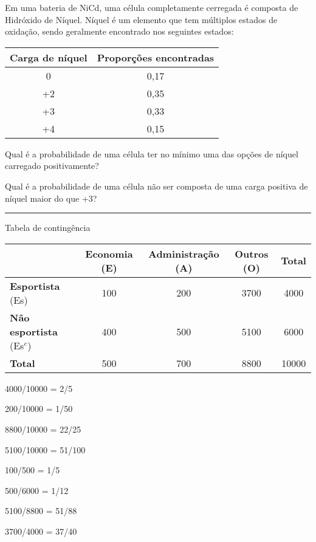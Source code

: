 \documentclass[a4paper,11pt,fleqn]{article}\usepackage[]{graphicx}\usepackage[]{color}
\theoremstyle{definition}
\begin{document}
\begin{compactenum}
\item Em uma bateria de NiCd,  uma célula completamente cerregada é
  composta de Hidróxido de Níquel. Níquel é um elemento que tem
  múltiplos estados de oxidação, sendo geralmente encontrado nos
  seguintes estados:
  \begin{table}[!h]
    \centering
    \begin{tabular}{cc}
      \hline
      \textbf{Carga de níquel}
      & \textbf{Proporções encontradas} \\
      \hline
      0 & 0,17 \\
      +2 & 0,35 \\
      +3 & 0,33 \\
      +4 & 0,15 \\
      \hline
    \end{tabular}
  \end{table}
  \begin{compactenum}
  \item Qual é a probabilidade de uma célula ter no mínimo uma das
    opções de níquel carregado positivamente?
  \item Qual é a probabilidade de uma célula não ser composta de uma
    carga positiva de níquel maior do que +3?
  \end{compactenum}

\vspace{0.3cm}
\hrule
\vspace{0.3cm}

\item Tabela de contingência
  \begin{table}[h]
    \centering
    \begin{tabular}{lcccc}
      \hline
      & \textbf{Economia} (E) & \textbf{Administração} (A) & \textbf{Outros} (O) &
      \textbf{Total} \\
      \hline
      \textbf{Esportista} (Es) & 100 & 200 & 3700 & 4000 \\
      \textbf{Não esportista} (Es$^c$) & 400 & 500 & 5100 & 6000 \\
      \hline
      \textbf{Total} & 500 & 700 & 8800 & 10000 \\
      \hline
    \end{tabular}
  \end{table}
  \begin{compactenum}
  \item 4000/10000 = 2/5
  \item 200/10000 = 1/50
  \item 8800/10000 = 22/25
  \item 5100/10000 = 51/100
  \item 100/500 = 1/5
  \item 500/6000 = 1/12
  \item 5100/8800 = 51/88
  \item 3700/4000 = 37/40
  \end{compactenum}


\end{compactenum}
\end{document}
